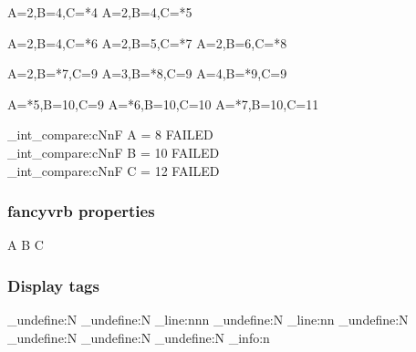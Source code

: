 \begin{CDRBlock} [
  tags=C,
  numbers=left,
  firstnumber=last,
]
A=2,B=4,C=*4
A=2,B=4,C=*5
\end{CDRBlock}

\begin{CDRBlock} [
  tags={C, B},
  numbers=left,
  firstnumber=last,
]
A=2,B=4,C=*6
A=2,B=5,C=*7
A=2,B=6,C=*8
\end{CDRBlock}

\begin{CDRBlock} [
  tags={B, A},
  numbers=left,
  firstnumber=last,
]
A=2,B=*7,C=9
A=3,B=*8,C=9
A=4,B=*9,C=9
\end{CDRBlock}
\begin{CDRBlock} [
  tags={A,C},
  numbers=left,
  firstnumber=last,
]
A=*5,B=10,C=9
A=*6,B=10,C=10
A=*7,B=10,C=11
\end{CDRBlock}

\ExplSyntaxOn
\CDR_int_compare:cNnF { A } = 8 { FAILED \\ }
\CDR_int_compare:cNnF { B } = {10} { FAILED \\ }
\CDR_int_compare:cNnF { C } = {12} { FAILED \\ }
\ExplSyntaxOff

\egroup

\subsubsection{\textsf{fancyvrb} properties}

\bgroup

\begin{CDRBlock} [
  pygments=false,
  tags=none,
  numbers=left,
  firstnumber=last,
]
A
B
C
\end{CDRBlock}

\newpage

\egroup

\subsubsection{Display tags}

\makeatletter
\ExplSyntaxOn

\cs_undefine:N \CDR@Line
\cs_undefine:N \CDR_line:nnn
\cs_undefine:N \CDR_line:nn
\cs_undefine:N \CDR@NumberFormat
\cs_undefine:N \CDR@TagsFormat
\cs_undefine:N \CDR@NumberSep
\cs_undefine:N \CDR_info:n

